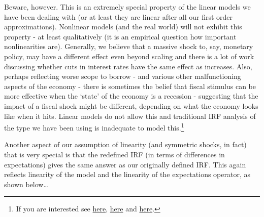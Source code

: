 \documentclass[authoryear,11pt]{elsarticle}
\begin{document}
Beware, however. This is an extremely special property of the linear models we have been dealing with (or at least they are linear after all our first order approximations). Nonlinear models (and the real world) will not exhibit this property - at least qualitatively (it is an empirical question how important nonlinearities are). Generally, we believe that a massive shock to, say, monetary policy, may have a different effect even beyond scaling and there is a lot of work discussing whether cuts in interest rates have the same effect as increases. Also, perhaps reflecting worse scope to borrow - and various other malfunctioning aspects of the economy - there is sometimes the belief that fiscal stimulus can be more effective when the `state' of the economy is a recession - suggesting that the impact of a fiscal shock might be different, depending on what the economy looks like when it hits. Linear models do not allow this and traditional IRF analysis of the type we have been using is inadequate to model this.\footnote{If you are interested see \href{https://www.richmondfed.org/-/media/richmondfedorg/publications/research/economic_brief/2017/pdf/eb_17-03.pdf}{here}, \href{https://www.sciencedirect.com/science/article/pii/0304407695017534}{here} and \href{https://www.aeaweb.org/articles?id=10.1257/0002828053828518}{here}.}

Another aspect of our assumption of linearity (and symmetric shocks, in fact) that is very special is that the redefined IRF (in terms of differences in expectations) gives the same answer as our originally defined IRF. This again reflects linearity of the model and the linearity of the expectations operator, as shown below\ldots
\end{document}
